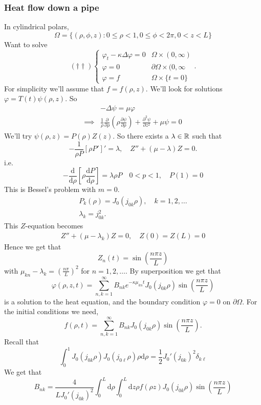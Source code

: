 \documentclass{article}
\begin{document}
\subsubsection{Heat flow down a pipe}
In cylindrical polars,
\[
	\Omega=\{(\rho,\phi,z):0\le \rho < 1, 0\le \phi<2\pi, 0<z<L\}
\]
Want to solve
\[
	(\dagger\dagger) \begin{cases}
	  \varphi_t-\kappa\Delta\varphi=0 & \Omega\times (0,\infty) \\
	  \varphi = 0 & \partial\Omega\times (0,\infty \\
	  \varphi = f & \Omega \times \{t=0\}
  \end{cases}.
\]
For simplicity we'll assume that $ f=f(\rho, z) $. We'll look for solutions $ \varphi=T(t)\psi(\rho,z) $. So
\begin{align*}
  &-\Delta\psi = \mu \varphi \\
	\implies &\frac 1\rho\frac{\partial}{\partial \rho}\left(\rho\frac{\partial \psi}{\partial \rho}\right)+\frac{\partial ^2 \psi}{\partial z^2}+\mu \psi=0
\end{align*}
We'll try $ \psi(\rho,z)=P(\rho)Z(z) $. So there exists a $ \lambda\in \mathbb{R} $ such that
\[
	-\frac 1{\rho P}[\rho P']'=\lambda,\quad Z''+(\mu-\lambda)Z=0.
\]
i.e.
\[
	-\frac{\mathrm d}{\mathrm d\rho}\left[\rho\frac{\mathrm dP}{\mathrm d\rho}\right]=\lambda\rho P\quad 0<p<1,\quad P(1)=0
\]
This is Bessel's problem with $ m=0 $.
\begin{align*}
	P_k(\rho)=J_0(j_{0k}\rho),\quad k=1,2,\dots\\
	\lambda_k=j_{0k}^2.
\end{align*}
This $ Z $-equation becomes
\begin{align*}
  Z''+(\mu-\lambda_k)Z=0,\quad Z(0)=Z(L)=0
\end{align*}
Hence we get that
\[
	Z_n(t)=\sin(\frac{n\pi z}L)
\]
with $ \mu_{kn}-\lambda_k=\left(\frac{n\pi}L\right)^2 $ for $ n=1,2,\dots $. By superposition we get that
\[
	\varphi(\rho,z,t)=\sum_{n,k=1}^\infty B_{nk}e^{-\kappa \mu_{kn}t}J_0(j_{0k}\rho)\sin(\frac{n\pi z}L)
\]
is a solution to the heat equation, and the boundary condition $ \varphi=0 $ on $ \partial \Omega $. For the initial conditions we need,
\[
	f(\rho,t)=\sum_{n,k=1}^\infty B_{nk}J_0(j_{0k}\rho)\sin(\frac{n\pi z}L).
\]
Recall that
\[
	\int_0^1J_0(j_{0k}\rho)J_0(j_{0\ell}\rho)\rho\mathrm d\rho=\frac 12J_0'(j_{0k})^2\delta_{k\ell}
\]
We get that
\[
	B_{nk}=\frac 4{LJ_0'(j_{0k})^2}\int_0^L\mathrm d\rho \int_0^L\mathrm dz\rho f(\rho z)J_0(j_{0k}\rho)\sin(\frac{n\pi z}L)
\]
\end{document}
